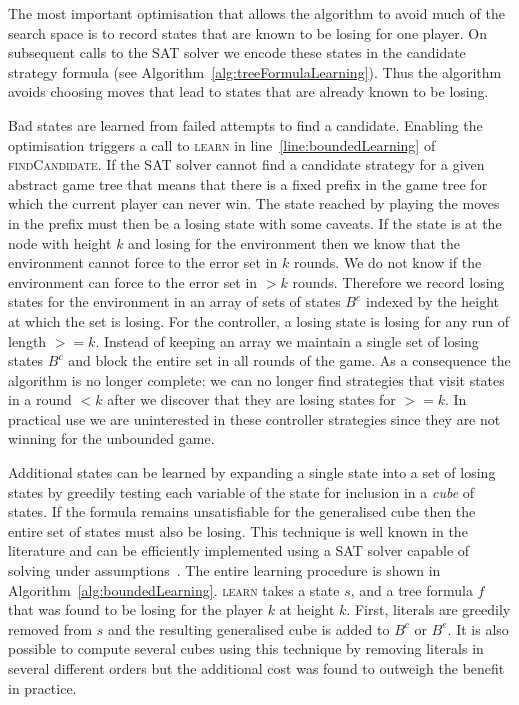 The most important optimisation that allows the algorithm to avoid much of the search space is to record states that are known to be losing for one player. On subsequent calls to the SAT solver we encode these states in the candidate strategy formula (see Algorithm~\ref{alg:treeFormulaLearning}). Thus the algorithm avoids choosing moves that lead to states that are already known to be losing.

Bad states are learned from failed attempts to find a candidate. Enabling the optimisation triggers a call to \textsc{learn} in line~\ref{line:boundedLearning} of \textsc{findCandidate}.  If the SAT solver cannot find a candidate strategy for a given abstract game tree that means that there is a fixed prefix in the game tree for which the current player can never win. The state reached by playing the moves in the prefix must then be a losing state with some caveats. If the state is at the node with height $k$ and losing for the environment then we know that the environment cannot force to the error set in $k$ rounds. We do not know if the environment can force to the error set in $> k$ rounds. Therefore we record losing states for the environment in an array of sets of states $B^e$ indexed by the height at which the set is losing. For the controller, a losing state is losing for any run of length $>= k$. Instead of keeping an array we maintain a single set of losing states $B^c$ and block the entire set in all rounds of the game. As a consequence the algorithm is no longer complete: we can no longer find strategies that visit states in a round $<k$ after we discover that they are losing states for $>=k$. In practical use we are uninterested in these controller strategies since they are not winning for the unbounded game.

Additional states can be learned by expanding a single state into a set of losing states by greedily testing each variable of the state for inclusion in a \emph{cube} of states. If the formula remains unsatisfiable for the generalised cube then the entire set of states must also be losing. This technique is well known in the literature and can be efficiently implemented using a SAT solver capable of solving under assumptions~\cite{Een03}. The entire learning procedure is shown in Algorithm~\ref{alg:boundedLearning}. \textsc{learn} takes a state $s$, and a tree formula $f$ that was found to be losing for the player $k$ at height $k$. First, literals are greedily removed from $s$ and the resulting generalised cube is added to $B^c$ or $B^e$. It is also possible to compute several cubes using this technique by removing literals in several different orders but the additional cost was found to outweigh the benefit in practice.

